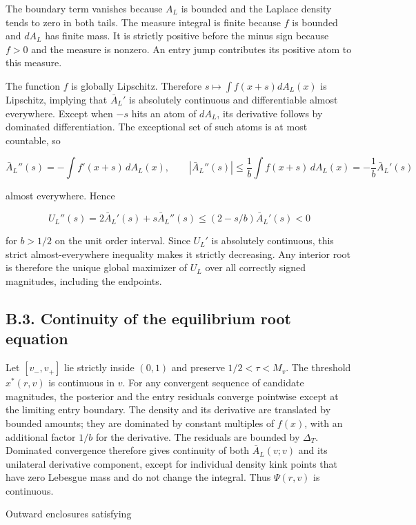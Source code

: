 \documentclass[
  11pt,
]{article}
\begin{document}
The boundary term vanishes because \(A_L\) is bounded and the Laplace
density tends to zero in both tails. The measure integral is finite
because \(f\) is bounded and \(dA_L\) has finite mass. It is strictly
positive before the minus sign because \(f>0\) and the measure is
nonzero. An entry jump contributes its positive atom to this measure.

The function \(f\) is globally Lipschitz. Therefore
\(s\mapsto\int f(x+s)dA_L(x)\) is Lipschitz, implying that \(\bar A_L'\) is
absolutely continuous and differentiable almost everywhere. Except when
\(-s\) hits an atom of \(dA_L\), its derivative follows by dominated
differentiation. The exceptional set of such atoms is at most countable,
so

\[
\bar A_L''(s)=-\int f'(x+s)\,dA_L(x),\qquad
|\bar A_L''(s)|\le\frac1b\int f(x+s)\,dA_L(x)=-\frac1b\bar A_L'(s)
\tag{OA.68}\label{eq:oa-oa-68}
\]

almost everywhere. Hence

\[
U_L''(s)=2\bar A_L'(s)+s\bar A_L''(s)
\le(2-s/b)\bar A_L'(s)<0
\tag{OA.69}\label{eq:oa-oa-69}
\]

for \(b>1/2\) on the unit order interval. Since \(U_L'\) is absolutely
continuous, this strict almost-everywhere inequality makes it strictly
decreasing. Any interior root is therefore the unique global maximizer
of \(U_L\) over all correctly signed magnitudes, including the
endpoints.

\subsection{B.3. Continuity of the equilibrium root
equation}\label{oa-b-root}

Let \([v_-,v_+]\) lie strictly inside \((0,1)\) and preserve
\(1/2<\tau<M_v\). The threshold \(x^*(r,v)\) is continuous in \(v\). For
any convergent sequence of candidate magnitudes, the posterior and the
entry residuals converge pointwise except at the limiting entry
boundary. The density and its derivative are translated by bounded
amounts; they are dominated by constant multiples of \(f(x)\), with an
additional factor \(1/b\) for the derivative. The residuals are bounded
by \(\Delta_T\). Dominated convergence therefore gives continuity of
both \(\bar A_L(v;v)\) and its unilateral derivative component, except for
individual density kink points that have zero Lebesgue mass and do not
change the integral. Thus \(\Psi(r,v)\) is continuous.

Outward enclosures satisfying
\end{document}
